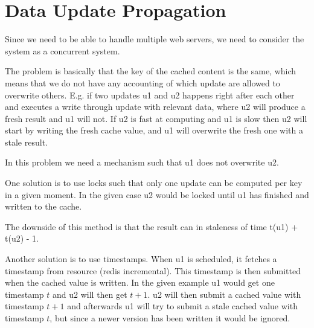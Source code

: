 \chapter{Data Update Propagation}
\label{subsec:data_update_propagation}

%
%
%



Since we need to be able to handle multiple web servers, we need to consider
the system as a concurrent system.

The problem is basically that the key of the cached content is the same, which
means that we do not have any accounting of which update are allowed to
overwrite others. E.g. if two updates u1 and u2 happens right after each other
and executes a write through update with relevant data, where u2 will produce
a fresh result and u1 will not. If u2 is fast at computing and u1 is slow then
u2 will start by writing the fresh cache value, and u1 will overwrite the
fresh one with a stale result.

In this problem we need a mechanism such that u1 does not overwrite u2.


One solution is to use locks such that only one update can be computed per
key in a given moment. In the given case u2 would be locked until u1 has
finished and written to the cache.

The downside of this method is that the result can in staleness of time t(u1) + t(u2) - 1.


Another solution is to use timestamps. When u1 is scheduled, it fetches a
timestamp from resource (redis incremental). This timestamp is then submitted
when the cached value is written. In the given example u1 would get one
timestamp $t$ and u2 will then get $t + 1$. u2 will then submit a cached value
with timestamp $t + 1$ and afterwards u1 will try to submit a stale cached value
with timestamp $t$, but since a newer version has been written it would be ignored.

